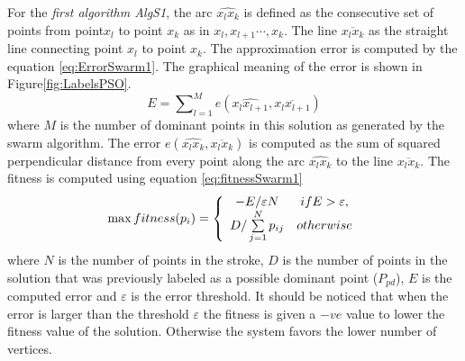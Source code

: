 \documentclass{article}
\begin{document}
For the \textit{first algorithm \textsl{AlgS1}}, 
 the arc $\widehat{x_lx_k}$ is defined as the consecutive set of points from point$x_l$ to point $x_{k}$ as in $x_l,x_{l+1} \cdots,x_k$. The line $\overline{x_l x_k} $ as the straight line connecting point $x_l$ to point $x_k$. The approximation error is computed by the equation \ref{eq:ErrorSwarm1}. The graphical meaning of the error is shown in Figure\ref{fig:LabelsPSO}.
\begin{equation}
E=\sum\nolimits_{l = 1}^M e ( \widehat{x_lx_{l+1}},\overline{x_l x_{l+1}})
\label{eq:ErrorSwarm1}
\end{equation} where $M$ is the number of dominant points in this solution as generated by the swarm algorithm. The error $e ( \widehat{x_lx_k},\overline{x_l x_k})$ is computed as the sum of squared perpendicular distance from every point along the arc $\widehat{x_lx_k}$ to the line $\overline{x_l x_k}$. The fitness is computed using equation \ref{eq:fitnessSwarm1}\begin{equation}
\max fitness(p_i ) = \left\{ {\begin{array}{*{20}c}
   { - E/\varepsilon N} & {ifE > \varepsilon ,}  \\
   {D/\sum\limits_{j = 1}^N {p_{ij} } } & {otherwise}  \\
\end{array}} \right.
\label{eq:fitnessSwarm1}
\end{equation} where $N$ is the number of points in the stroke, $D$ is the number of points in the solution that was previously labeled as a possible dominant point ($P_{pd}$), $E$ is the computed error and $\varepsilon$ is the error threshold. It should be noticed that when the error is larger than the threshold $\varepsilon$ the fitness is given a $-ve$ value to lower the fitness value of the solution. Otherwise the system favors the lower number of vertices.
\end{document}
